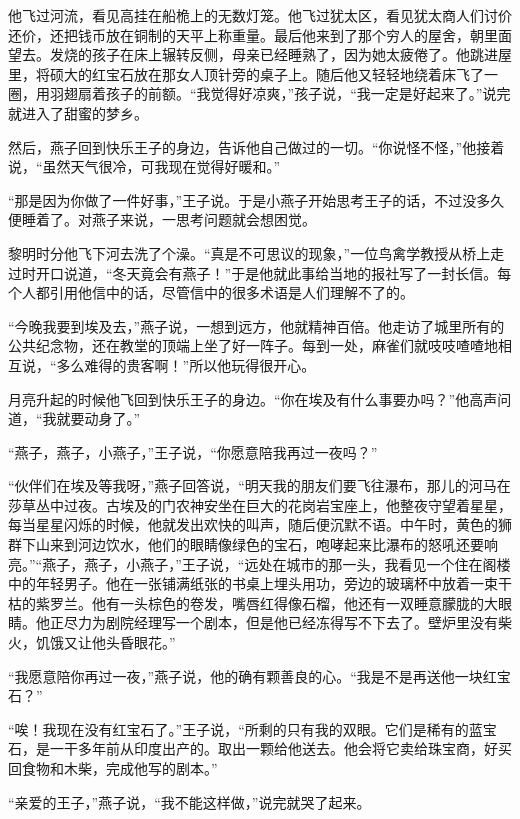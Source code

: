 \documentclass[12pt,UTF-8,openany]{ctexbook}
\begin{document}
\begin{normalsize}
    他飞过河流，看见高挂在船桅上的无数灯笼。他飞过犹太区，看见犹太商人们讨价还价，还把钱币放在铜制的天平上称重量。最后他来到了那个穷人的屋舍，朝里面望去。发烧的孩子在床上辗转反侧，母亲已经睡熟了，因为她太疲倦了。他跳进屋里，将硕大的红宝石放在那女人顶针旁的桌子上。随后他又轻轻地绕着床飞了一圈，用羽翅扇着孩子的前额。“我觉得好凉爽，”孩子说，“我一定是好起来了。”说完就进入了甜蜜的梦乡。
    
    然后，燕子回到快乐王子的身边，告诉他自己做过的一切。“你说怪不怪，”他接着说，“虽然天气很冷，可我现在觉得好暖和。”
    
    “那是因为你做了一件好事，”王子说。于是小燕子开始思考王子的话，不过没多久便睡着了。对燕子来说，一思考问题就会想困觉。
    
    黎明时分他飞下河去洗了个澡。“真是不可思议的现象，”一位鸟禽学教授从桥上走过时开口说道，“冬天竟会有燕子！”于是他就此事给当地的报社写了一封长信。每个人都引用他信中的话，尽管信中的很多术语是人们理解不了的。
    
    “今晚我要到埃及去，”燕子说，一想到远方，他就精神百倍。他走访了城里所有的公共纪念物，还在教堂的顶端上坐了好一阵子。每到一处，麻雀们就吱吱喳喳地相互说，“多么难得的贵客啊！”所以他玩得很开心。
    
    月亮升起的时候他飞回到快乐王子的身边。“你在埃及有什么事要办吗？”他高声问道，“我就要动身了。”
    
    “燕子，燕子，小燕子，”王子说，“你愿意陪我再过一夜吗？”
    
    “伙伴们在埃及等我呀，”燕子回答说，“明天我的朋友们要飞往瀑布，那儿的河马在莎草丛中过夜。古埃及的门农神安坐在巨大的花岗岩宝座上，他整夜守望着星星，每当星星闪烁的时候，他就发出欢快的叫声，随后便沉默不语。中午时，黄色的狮群下山来到河边饮水，他们的眼睛像绿色的宝石，咆哮起来比瀑布的怒吼还要响亮。”“燕子，燕子，小燕子，”王子说，“远处在城市的那一头，我看见一个住在阁楼中的年轻男子。他在一张铺满纸张的书桌上埋头用功，旁边的玻璃杯中放着一束干枯的紫罗兰。他有一头棕色的卷发，嘴唇红得像石榴，他还有一双睡意朦胧的大眼睛。他正尽力为剧院经理写一个剧本，但是他已经冻得写不下去了。壁炉里没有柴火，饥饿又让他头昏眼花。”
    
    “我愿意陪你再过一夜，”燕子说，他的确有颗善良的心。“我是不是再送他一块红宝石？”
    
    “唉！我现在没有红宝石了。”王子说，“所剩的只有我的双眼。它们是稀有的蓝宝石，是一干多年前从印度出产的。取出一颗给他送去。他会将它卖给珠宝商，好买回食物和木柴，完成他写的剧本。”
    
    “亲爱的王子，”燕子说，“我不能这样做，”说完就哭了起来。
    

\end{normalsize}
\end{document}
